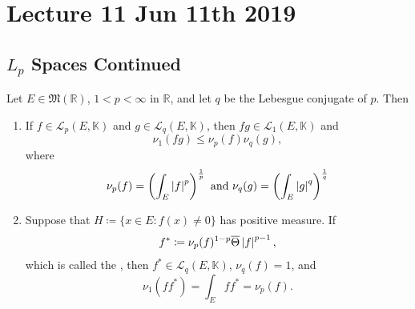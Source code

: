 \documentclass[notoc,notitlepage]{tufte-book}
\begin{document}


\chapter{Lecture 11 Jun 11th 2019}%
\label{chp:lecture_11_jun_11th_2019}

\section{\texorpdfstring{$L_p$}{Lp} Spaces Continued}%
\label{sec:_l_p_spaces_continued}

\begin{thm}\label{thm:holders_inequality}
  Let $E \in \mathfrak{M}(\mathbb{R})$, $1 < p < \infty$ in $\mathbb{R}$, and
  let $q$ be the Lebesgue conjugate of $p$. Then
  \begin{enumerate}
    \item If $f \in \mathcal{L}_p(E, \mathbb{K})$ and $g \in \mathcal{L}_q(E,
      \mathbb{K})$, then $fg \in \mathcal{L}_1(E, \mathbb{K})$ and
      \begin{equation*}
        \nu_1(fg) \leq \nu_p(f) \nu_q(g),
      \end{equation*}
      where
      \begin{equation*}
        \nu_p(f) = \left( \int_{E} \left|f\right|^p \right)^{\frac{1}{p}} \text{ and }
        \nu_q(g) = \left( \int_{E} \left|g\right|^q \right)^{\frac{1}{q}}
      \end{equation*}

    \item Suppose that $H \coloneqq \{ x \in E : f(x) \neq 0 \}$ has positive
      measure. If
      \begin{equation*}
        f^* \coloneqq \nu_p(f)^{1-p} \overline{\Theta} \left|f\right|^{p-1},
      \end{equation*}
      which is called the , then $f^* \in
      \mathcal{L}_q(E, \mathbb{K})$, $\nu_q(f) = 1$, and
      \begin{equation*}
        \nu_1(ff^*) = \int_{E} ff^* = \nu_p(f).
      \end{equation*}
  \end{enumerate}
\end{thm}
\end{document}
